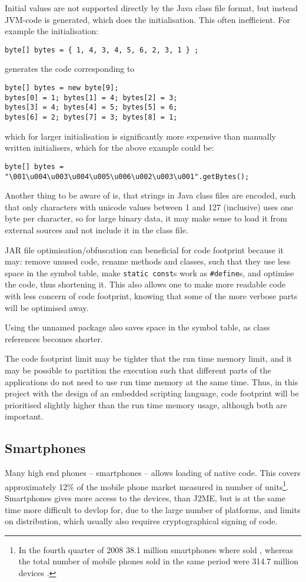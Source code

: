 \documentclass[11pt]{report}
\begin{document}
Initial values are not supported directly by the Java class file format, but instead
JVM-code is generated, which does the initialisation. 
This often inefficient. For example the initialisation:
\begin{verbatim}
byte[] bytes = { 1, 4, 3, 4, 5, 6, 2, 3, 1 } ;
\end{verbatim}
generates the code corresponding to
\begin{verbatim}
byte[] bytes = new byte[9];
bytes[0] = 1; bytes[1] = 4; bytes[2] = 3;
bytes[3] = 4; bytes[4] = 5; bytes[5] = 6;
bytes[6] = 2; bytes[7] = 3; bytes[8] = 1;
\end{verbatim}
which for larger initialisation is significantly more expensive than manually written initialisers,
which for the above example could be:
\begin{verbatim}
byte[] bytes = "\001\u004\u003\u004\u005\u006\u002\u003\u001".getBytes();
\end{verbatim}

Another thing to be aware of is, that strings in Java class files are encoded, such that only characters with unicode values between 1 and 127 (inclusive) uses one byte per character, so for large binary data, it may make sense to load it from external sources and not include it in the class file.

JAR file optimisation/obfuscation can beneficial for code footprint because it may:
remove unused code,
rename methods and classes, such that they use less space in the symbol table,
make \verb|static const|s work as \verb|#define|s,
 and optimise the code, thus shortening it.
This also allows one to make more readable code with less concern of code footprint, knowing that some of the more verbose parts will be optimised away.

Using the unnamed package also saves space in the symbol table, as class references becomes shorter.

The code footprint limit may be tighter that the run time memory limit, and it may be possible to partition the execution such that different parts of the applications do not need to use run time memory at the same time.
Thus, in this project with the design of an embedded scripting language, code footprint will be prioritised slightly higher than the run time memory usage, although both are important.

\subsection{Smartphones}
Many high end phones -- smartphones --  allows loading of native code. 
This covers approximately 12\% of the mobile phone market measured in number of units\footnote{In the fourth quarter of 2008 38.1 million smartphones where sold \cite{gartner}, whereas the total number of mobile phones sold in the same period were 314.7 million devices \cite{cellular-news}.}.
Smartphones gives more access to the devices, than J2ME, but is at the same time more difficult to devlop for, due to the large number of platforms, and limits on distribution, which usually also requires cryptographical signing of code.
\end{document}
